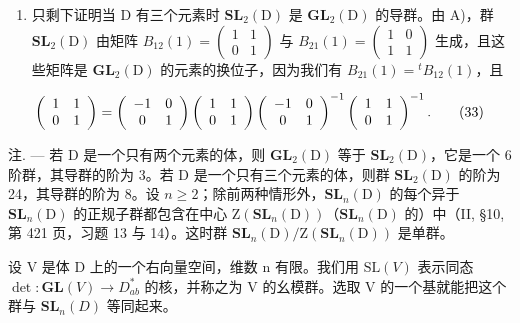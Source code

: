 \begin{enumerate}
\def\labelenumi{\Alph{enumi})}
\setcounter{enumi}{2}
\tightlist
\item
  只剩下证明当 D 有三个元素时 \(\mathbf{SL}_{2}(\mathrm{D})\) 是 \(\mathbf{GL}_{2}(\mathrm{D})\) 的导群。由 A)，群 \(\mathbf{SL}_{2}(\mathrm{D})\) 由矩阵 \(B_{12}(1)=(\begin{matrix}{1}&{1}\\ {0}&{1}\end{matrix})\) 与 \(B_{21}(1)=(\begin{matrix}{1}&{0}\\ {1}&{1}\end{matrix})\) 生成，且这些矩阵是 \(\mathbf{GL}_{2}(\mathrm{D})\) 的元素的换位子，因为我们有 \(B_{21}(1)={}^{t}B_{12}(1)\)，且
\end{enumerate}

\[
\left( \begin{array}{c c} 1 & 1 \\ 0 & 1 \end{array} \right) = \left( \begin{array}{c c} - 1 & 0 \\ 0 & 1 \end{array} \right) \left( \begin{array}{c c} 1 & 1 \\ 0 & 1 \end{array} \right) \left( \begin{array}{c c} - 1 & 0 \\ 0 & 1 \end{array} \right) ^ {- 1} \left( \begin{array}{c c} 1 & 1 \\ 0 & 1 \end{array} \right) ^ {- 1}.\tag{33}
\]

注. --- 若 D 是一个只有两个元素的体，则 \(\mathbf{GL}_{2}(\mathrm{D})\) 等于 \(\mathbf{SL}_{2}(\mathrm{D})\)，它是一个 6 阶群，其导群的阶为 3。若 D 是一个只有三个元素的体，则群 \(\mathbf{SL}_{2}(\mathrm{D})\) 的阶为 24，其导群的阶为 8。设 \(n \geqslant 2\)；除前两种情形外，\(\mathbf{SL}_{n}(\mathrm{D})\) 的每个异于 \(\mathbf{SL}_{n}(\mathrm{D})\) 的正规子群都包含在中心 \(\mathrm{Z}(\mathbf{SL}_{n}(\mathrm{D}))\)（\(\mathbf{SL}_{n}(\mathrm{D})\) 的）中（II, §10, 第 421 页，习题 13 与 14）。这时群 \(\mathbf{SL}_{n}(\mathrm{D})/\mathrm{Z}(\mathbf{SL}_{n}(\mathrm{D}))\) 是单群。

设 V 是体 D 上的一个右向量空间，维数 n 有限。我们用 \(\mathrm{SL}(V)\) 表示同态 \(\det: \mathbf{GL}(V) \to D_{ab}^{*}\) 的核，并称之为 V 的幺模群。选取 V 的一个基就能把这个群与 \(\mathbf{SL}_{n}(D)\) 等同起来。


